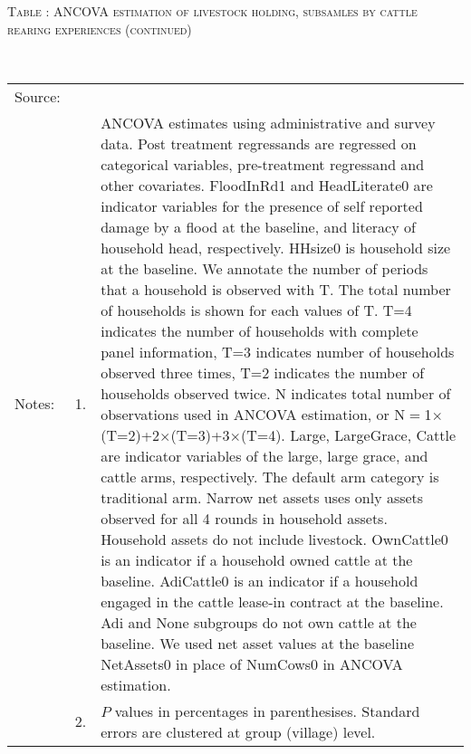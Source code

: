 \addtocounter{table}{-1}
\vspace{-1cm}\hspace{-1cm}\begin{minipage}[t]{14cm}
\hfil\textsc{\normalsize Table \thetable: ANCOVA estimation of livestock holding, subsamles by cattle rearing experiences (continued)\label{tab ANCOVA net assets experience 2}}\\
\setlength{\tabcolsep}{1pt}
\setlength{\baselineskip}{8pt}
\renewcommand{\arraystretch}{.52}
\hfil{}\\
\renewcommand{\arraystretch}{.8}
\setlength{\tabcolsep}{1pt}
\begin{tabular}{>{\hfill\scriptsize}p{1cm}<{}>{\hfill\scriptsize}p{.25cm}<{}>{\scriptsize}p{12cm}<{\hfill}}
Source:& \multicolumn{2}{l}{\scriptsize Estimated with GUK administrative and survey data.}\\
Notes: & 1. & ANCOVA estimates using administrative and survey data. Post treatment regressands are regressed on categorical variables, pre-treatment regressand and other covariates. \textsf{FloodInRd1} and \textsf{HeadLiterate0} are indicator variables for the presence of self reported damage by a flood at the baseline, and literacy of household head, respectively. \textsf{HHsize0} is household size at the baseline. We annotate the number of periods that a household is observed with \textsf{T}. The total number of households is shown for each values of \textsf{T}. \textsf{T=4} indicates the number of households with complete panel information, \textsf{T=3} indicates number of households observed three times, \textsf{T=2} indicates the number of households observed twice. \textsf{N} indicates total number of observations used in ANCOVA estimation, or \textsf{N$=$1$\times$(T=2)+2$\times$(T=3)+3$\times$(T=4)}.  \textsf{Large}, \textsf{LargeGrace}, \textsf{Cattle} are indicator variables of the \textsf{large}, \textsf{large grace}, and \textsf{cattle} arms, respectively. The default arm category is \textsf{traditional} arm. Narrow net assets uses only assets observed for all 4 rounds in household assets. Household assets do not include livestock. \textsf{OwnCattle0} is an indicator if a household owned cattle at the baseline. \textsf{AdiCattle0} is an indicator if a household engaged in the cattle lease-in contract at the baseline.  \textsf{Adi} and \textsf{None} subgroups do not own cattle at the baseline. We used net asset values at the baseline \textsf{NetAssets0} in place of \textsf{NumCows0} in ANCOVA estimation. \\
& 2. & $P$ values in percentages in parenthesises. Standard errors are clustered at group (village) level.
\end{tabular}
\end{minipage}



